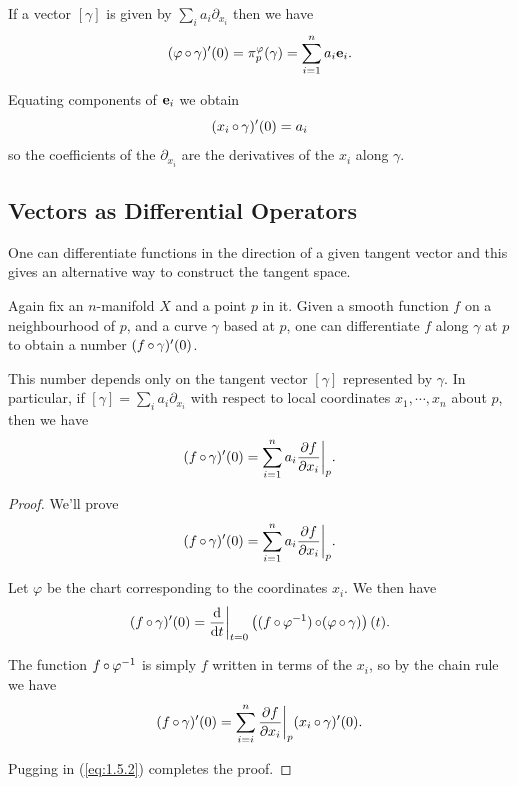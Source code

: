 \documentclass[a4paper,11pt]{article}
\begin{document}
	\begin{rmk}
		If a vector $[\gamma]$ is given by $\sum_i a_i \partial_{x_i}$ then we have
		\[
			(\varphi \operatorname{\circ} \gamma)'(0) = \pi_p^{\varphi}(\gamma) = \sum_{i = 1}^n a_i \vb e_i.
		\]
		
		Equating components of $\vb e_i$ we obtain
		\begin{equation}
			(x_i \operatorname{\circ} \gamma)'(0) = a_i
			\label{eq:1.5.2}
		\end{equation}
		so the coefficients of the $\partial_{x_i}$ are the derivatives of the $x_i$ along $\gamma$.
	\end{rmk}

	\subsection{Vectors as Differential Operators} 

	One can differentiate functions in the direction of a given tangent vector and this gives an alternative way to construct the tangent space.

	Again fix an $n$-manifold $X$ and a point $p$ in it. Given a smooth function $f$ on a neighbourhood of $p$, and a curve $\gamma$ based at $p$, one can differentiate $f$ along $\gamma$ at $p$ to obtain a number $(f \operatorname{\circ} \gamma)'(0)$.
	

	\begin{lem}
		This number depends only on the tangent vector $[\gamma]$ represented by $\gamma$. In particular, if $[\gamma] = \sum_i a_i \partial_{x_i}$ with respect to local coordinates $x_1, \cdots, x_n$ about $p$, then we have
		\[
			(f \operatorname{\circ} \gamma)'(0) = \sum_{i = 1}^n a_i \pdv{f}{x_i}\bigg|_{p}.
		\]
	\end{lem}

	\begin{proof}
		We'll prove
		\[
			(f \operatorname{\circ} \gamma)'(0) = \sum_{i=1}^n a_i \pdv{f}{x_i}\bigg|_{p}.
		\]
		
		Let $\varphi$ be the chart corresponding to the coordinates $x_i$. We then have
		\[
			(f \operatorname{\circ} \gamma)'(0) = \dv{t}\bigg|_{t=0} \left( (f \operatorname{\circ} \varphi^{-1}) \operatorname{\circ} (\varphi \operatorname{\circ} \gamma) \right) (t).
		\]
		
		The function $f \operatorname{\circ} \varphi^{-1}$ is simply $f$ written in terms of the $x_i$, so by the chain rule we have
		\[
			(f \operatorname{\circ} \gamma)'(0) = \sum_{i=i}^n \pdv{f}{x_i}\bigg|_{p} (x_i \operatorname{\circ} \gamma)' (0).
		\]
		
		Pugging in (\ref{eq:1.5.2}) completes the proof.
	\end{proof}
\end{document}
